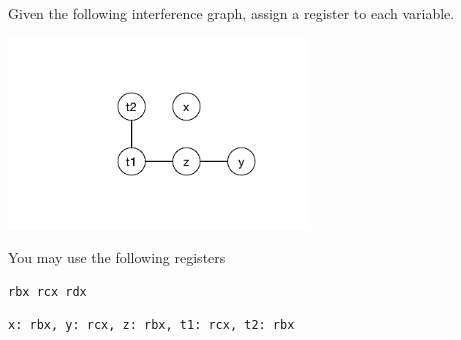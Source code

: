\documentclass[12pt,answers]{exam}
\begin{document}
\begin{questions}
\question[10] Given the following interference graph, assign a
register to each variable. 
\begin{center}
\includegraphics[height=2in]{interfere2}
\end{center}
You may use the following registers 
\begin{lstlisting}
rbx rcx rdx
\end{lstlisting}

\begin{solution}[1in]
\begin{lstlisting}
x: rbx, y: rcx, z: rbx, t1: rcx, t2: rbx
\end{lstlisting}
\end{solution}







\end{questions}
\end{document}
